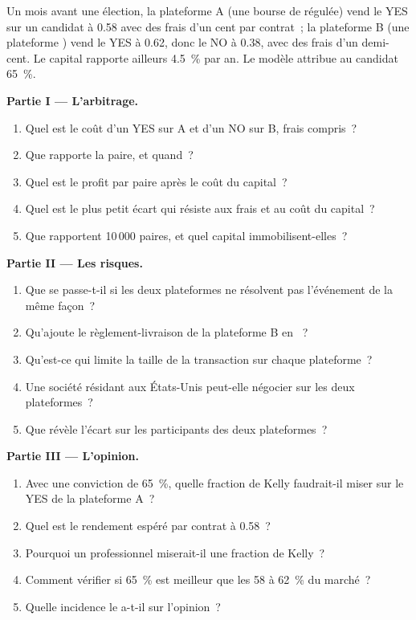 \begin{problem}\label{pb:m3:prediction-and-betting-markets:1}
Un mois avant une élection, la plateforme A (une bourse de  régulée) vend le YES sur un candidat à 0.58 avec des frais d'un cent par contrat~; la plateforme B (une
plateforme ) vend le YES à 0.62, donc le NO à 0.38, avec des frais d'un demi-cent. Le capital rapporte ailleurs 4.5~\% par an. Le modèle attribue au candidat 65~\%.

\medskip\noindent\textbf{Partie I --- L'arbitrage.}
\begin{enumerate}
\item Quel est le coût d'un YES sur A et d'un NO sur B, frais compris~?
\item Que rapporte la paire, et quand~?
\item Quel est le profit par paire après le coût du capital~?
\item Quel est le plus petit écart qui résiste aux frais et au coût du capital~?
\item Que rapportent 10\,000 paires, et quel capital immobilisent-elles~?
\end{enumerate}

\medskip\noindent\textbf{Partie II --- Les risques.}
\begin{enumerate}[resume]
\item Que se passe-t-il si les deux plateformes ne résolvent pas l'événement de la même façon~?
\item Qu'ajoute le règlement-livraison de la plateforme B en ~?
\item Qu'est-ce qui limite la taille de la transaction sur chaque plateforme~?
\item Une société résidant aux États-Unis peut-elle négocier sur les deux plateformes~?
\item Que révèle l'écart sur les participants des deux plateformes~?
\end{enumerate}

\medskip\noindent\textbf{Partie III --- L'opinion.}
\begin{enumerate}[resume]
\item Avec une conviction de 65~\%, quelle fraction de Kelly faudrait-il miser sur le YES de la plateforme A~?
\item Quel est le rendement espéré par contrat à 0.58~?
\item Pourquoi un professionnel miserait-il une fraction de Kelly~?
\item Comment vérifier si 65~\% est meilleur que les 58 à 62~\% du marché~?
\item Quelle incidence le  a-t-il sur l'opinion~?
\end{enumerate}


\end{problem}
